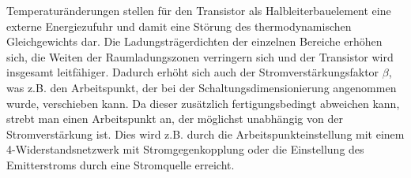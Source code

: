 Temperaturänderungen stellen für den Transistor als Halbleiterbauelement eine
externe Energiezufuhr und damit eine Störung des thermodynamischen
Gleichgewichts dar. Die Ladungsträgerdichten der einzelnen Bereiche
erhöhen sich, die Weiten der Raumladungszonen verringern sich und der Transistor
wird insgesamt leitfähiger. Dadurch erhöht sich auch der
Stromverstärkungsfaktor $\beta$, was z.B. den Arbeitspunkt, der bei der
Schaltungsdimensionierung angenommen wurde, verschieben kann. Da dieser zusätzlich
fertigungsbedingt abweichen kann, strebt man einen
Arbeitspunkt an, der möglichst unabhängig von der Stromverstärkung ist. Dies
wird z.B. durch die Arbeitspunkteinstellung mit einem 4-Widerstandsnetzwerk mit Stromgegenkopplung oder die Einstellung des Emitterstroms durch eine Stromquelle erreicht.


